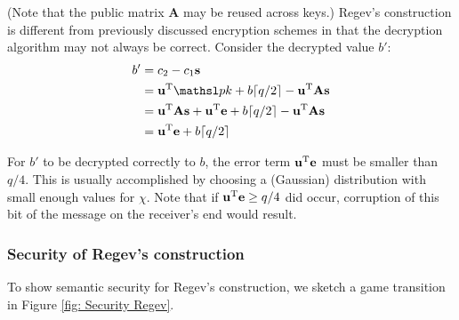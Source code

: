 \noindent (Note that the public matrix $\textbf{A}$ may be reused across keys.) Regev's construction is different from previously discussed encryption schemes in that the decryption algorithm may not always be correct. Consider the decrypted value $b'$:
\begin{align*}
b'  &= c_2 - c_1 \varvect{s}\\
    &= \varvect{u}^{\textnormal{T}} \pk + b \lceil q/2 \rceil - \varvect{u}^{\textnormal{T}} \varvect{A}\varvect{s}\\
    &= \varvect{u}^{\textnormal{T}}\varvect{A}\varvect{s} + \varvect{u}^{\textnormal{T}}\varvect{e} + b \lceil q/2 \rceil - \varvect{u}^{\textnormal{T}} \varvect{A}\varvect{s}\\
    &= \varvect{u}^{\textnormal{T}}\varvect{e} + b \lceil q/2 \rceil
\end{align*}

\noindent For $b'$ to be decrypted correctly to $b$, the error term $\mathbf{u}^{\textnormal{T}}\mathbf{e}$ must be smaller than $q/4$. This is usually accomplished by choosing a (Gaussian) distribution with small enough values for $\chi$. Note that if $\mathbf{u}^{\textnormal{T}}\mathbf{e} \ge q/4$ did occur, corruption of this bit of the message on the receiver's end would result.

\subsubsection{Security of Regev's construction}

To show semantic security for Regev's construction, we sketch a game transition in Figure \ref{fig: Security Regev}.


